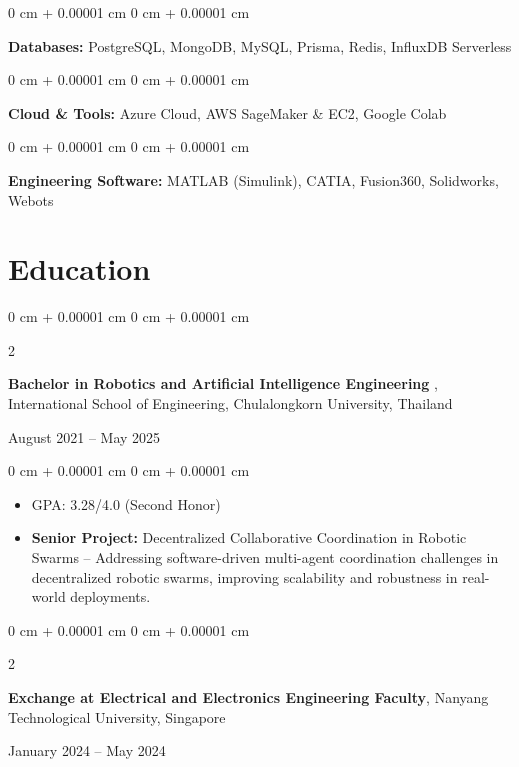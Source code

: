 \documentclass[10pt, letterpaper]{article}
\newenvironment{highlights}{
    \begin{itemize}[
        topsep=0.0 cm,
        parsep=0.0 cm,
        partopsep=0pt,
        itemsep=0pt,
        leftmargin=0 cm + 10pt
    ]
}{
    \end{itemize}
} %
\newenvironment{onecolentry}{
    \begin{adjustwidth}{
        0 cm + 0.00001 cm
    }{
        0 cm + 0.00001 cm
    }
}{
    \end{adjustwidth}
} %
\newenvironment{twocolentry}[2][]{
    \onecolentry
    \def\secondColumn{#2}
    \setcolumnwidth{\fill, 4.5 cm}
    \begin{paracol}{2}
}{
    \switchcolumn \raggedleft \secondColumn
    \end{paracol}
    \endonecolentry
} %
\begin{document}
        \vspace{0.1 cm}
        \begin{onecolentry}
            \textbf{Databases:} PostgreSQL, MongoDB, MySQL, Prisma, Redis, InfluxDB Serverless
        \end{onecolentry}
        
        \vspace{0.1 cm}
        \begin{onecolentry}
            \textbf{Cloud \& Tools:} Azure Cloud, AWS SageMaker \& EC2, Google Colab
        \end{onecolentry}
        
        \vspace{0.1 cm}
        \begin{onecolentry}
            \textbf{Engineering Software:} MATLAB (Simulink), CATIA, Fusion360, Solidworks, Webots
        \end{onecolentry}

    \section{Education}
    
        \begin{twocolentry}{
            August 2021 – May 2025
            }
            \textbf{Bachelor in Robotics and Artificial Intelligence Engineering }, International School of Engineering, Chulalongkorn University, Thailand
        \end{twocolentry}
        \begin{onecolentry}
            \begin{highlights}
                \item GPA: 3.28/4.0 (Second Honor)%
                \item \textbf{Senior Project:} Decentralized Collaborative Coordination in Robotic Swarms – Addressing software-driven multi-agent coordination challenges in decentralized robotic swarms, improving scalability and robustness in real-world deployments.
 
            \end{highlights}
        \end{onecolentry}
        \vspace{0.10 cm}
        
        \begin{twocolentry}{January 2024 – May 2024}
            \textbf{Exchange at Electrical and Electronics Engineering Faculty}, Nanyang Technological University, Singapore
        \end{twocolentry}
        
\end{document}
